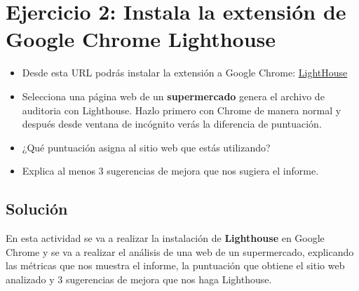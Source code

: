 \section{Ejercicio 2:  Instala la extensión de Google Chrome Lighthouse}
\begin{itemize}
    \item
    Desde esta URL podrás instalar la extensión a Google Chrome: \href{https://chromewebstore.google.com/detail/lighthouse/blipmdconlkpinefehnmjammfjpmpbjk?hl=es&pli=1}{LightHouse}

    \item Selecciona una página web de un \textbf{supermercado} genera el archivo de auditoria con Lighthouse. Hazlo primero con Chrome de manera normal y después desde ventana de incógnito verás la diferencia de puntuación.

    \item ¿Qué puntuación asigna al sitio web que estás utilizando?

    \item Explica al menos 3 sugerencias de mejora que nos sugiera el informe.
\end{itemize}

\subsection{Solución}
En esta actividad se va a realizar la instalación de \textbf{Lighthouse} en Google Chrome y se va a realizar el análisis de una web de un supermercado, explicando las métricas que nos muestra el informe, la puntuación que obtiene el sitio web analizado y 3 sugerencias de mejora que nos haga Lighthouse.

